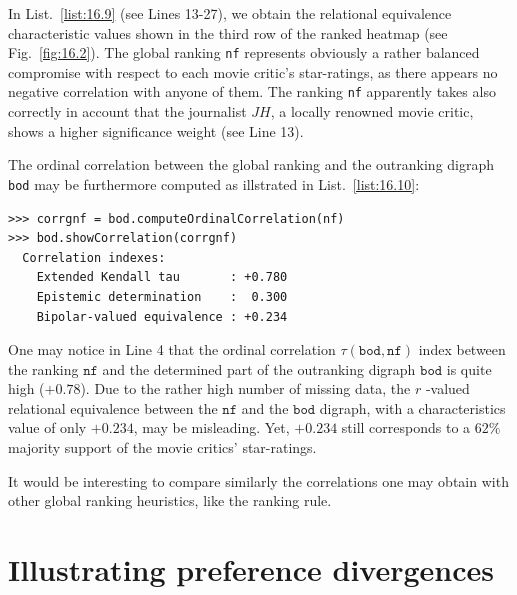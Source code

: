 In List.~\vref{list:16.9} (see Lines 13-27), we obtain the relational equivalence characteristic values shown in the third row of the ranked heatmap (see Fig.~\vref{fig:16.2}). The global \NetFlows ranking \texttt{nf} represents obviously a rather balanced compromise with respect to each movie critic's star-ratings, as there appears no negative correlation with anyone of them. The ranking \texttt{nf} apparently takes also correctly in account that the journalist $JH$, a locally renowned movie critic, shows a higher significance weight (see Line 13).

The ordinal correlation between the global \NetFlows ranking and the outranking digraph \texttt{bod} may be furthermore computed as illstrated in List.~\vref{list:16.10}: 
\begin{lstlisting}[caption={Computing the ordinal correlation between \NetFlows and global outranking digraph},label=list:16.10]
>>> corrgnf = bod.computeOrdinalCorrelation(nf)
>>> bod.showCorrelation(corrgnf)
  Correlation indexes:
    Extended Kendall tau       : +0.780
    Epistemic determination    :  0.300
    Bipolar-valued equivalence : +0.234
\end{lstlisting}
One may notice in Line 4 that the ordinal correlation $\tau(\mathtt{bod},\mathtt{nf})$ index between the \NetFlows ranking $\mathtt{nf}$ and the determined part of the outranking digraph $\mathtt{bod}$ is quite high ($+0.78$). Due to the rather high number of missing data, the $r$ -valued relational equivalence between the $\mathtt{nf}$ and the $\mathtt{bod}$ digraph, with a characteristics value of only $+0.234$, may be misleading. Yet, $+0.234$ still corresponds to a $62\%$ majority support of the movie critics' star-ratings.

It would be interesting to compare similarly the correlations one may obtain with other global ranking heuristics, like the \Copeland ranking rule.

\section{Illustrating preference divergences}
\label{sec:16.4}

